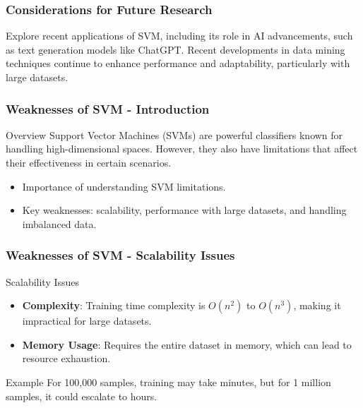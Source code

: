 \documentclass[aspectratio=169]{beamer}
\begin{document}
\begin{frame}[fragile]
    \frametitle{Considerations for Future Research}
    Explore recent applications of SVM, including its role in AI advancements, such as text generation models like ChatGPT. Recent developments in data mining techniques continue to enhance performance and adaptability, particularly with large datasets.
\end{frame}

\begin{frame}[fragile]
    \frametitle{Weaknesses of SVM - Introduction}
    \begin{block}{Overview}
        Support Vector Machines (SVMs) are powerful classifiers known for handling high-dimensional spaces. However, they also have limitations that affect their effectiveness in certain scenarios.
    \end{block}

    \begin{itemize}
        \item Importance of understanding SVM limitations.
        \item Key weaknesses: scalability, performance with large datasets, and handling imbalanced data.
    \end{itemize}
\end{frame}

\begin{frame}[fragile]
    \frametitle{Weaknesses of SVM - Scalability Issues}
    \begin{block}{Scalability Issues}
        \begin{itemize}
            \item \textbf{Complexity}: Training time complexity is $O(n^2)$ to $O(n^3)$, making it impractical for large datasets.
            \item \textbf{Memory Usage}: Requires the entire dataset in memory, which can lead to resource exhaustion.
        \end{itemize}
    \end{block}
    
    \begin{block}{Example}
        For 100,000 samples, training may take minutes, but for 1 million samples, it could escalate to hours.
    \end{block}
\end{frame}
\end{document}
